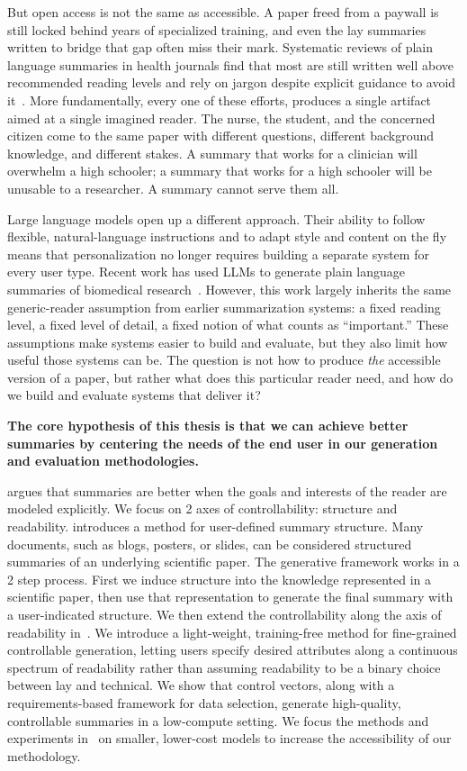 But open access is not the same as accessible. A paper freed from a paywall is still locked behind years of specialized training, and even the lay summaries written to bridge that gap often miss their mark. Systematic reviews of plain language summaries in health journals find that most are still written well above recommended reading levels and rely on jargon despite explicit guidance to avoid it~\cite{Gainey2024ArePL}. More fundamentally, every one of these efforts, produces a single artifact aimed at a single imagined reader. The nurse, the student, and the concerned citizen come to the same paper with different questions, different background knowledge, and different stakes. A summary that works for a clinician will overwhelm a high schooler; a summary that works for a high schooler will be unusable to a researcher. A summary cannot serve them all.
 
Large language models open up a different approach. Their ability to follow flexible, natural-language instructions and to adapt style and content on the fly means that personalization no longer requires building a separate system for every user type. Recent work has used LLMs to generate plain language summaries of biomedical research~\cite{Guo2020AutomatedLL,luo2022readability}. However, this work largely inherits the same generic-reader assumption from earlier summarization systems: a fixed reading level, a fixed level of detail, a fixed notion of what counts as ``important.'' These assumptions make systems easier to build and evaluate, but they also limit how useful those systems can be. The question is not how to produce \emph{the} accessible version of a paper, but rather what does this particular reader need, and how do we build and evaluate systems that deliver it?
 
\textbf{The core hypothesis of this thesis is that we can achieve better summaries by centering the needs of the end user in our generation and evaluation methodologies.}
 
 argues that summaries are better when the goals and interests of the reader are modeled explicitly. We focus on 2 axes of controllability: structure and readability.  introduces a method for user-defined summary structure. Many documents, such as blogs, posters, or slides, can be considered structured summaries of an underlying scientific paper. The generative framework works in a 2 step process. First we induce structure into the knowledge represented in a scientific paper, then use that representation to generate the final summary with a user-indicated structure. We then extend the controllability along the axis of readability in~. We introduce a light-weight, training-free method for fine-grained controllable generation, letting users specify desired attributes along a continuous spectrum of readability rather than assuming readability to be a binary choice between lay and technical. We show that control vectors, along with a requirements-based framework for data selection, generate high-quality, controllable summaries in a low-compute setting. We focus the methods and experiments in~ on smaller, lower-cost models to increase the accessibility of our methodology.
 
